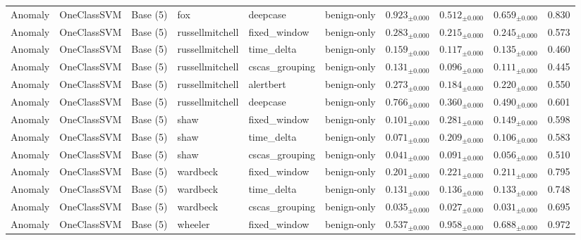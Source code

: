 \begin{longtable}{llllllcccc}
\addlinespace
Anomaly & OneClassSVM & Base (5) & fox & deepcase & benign-only & $0.923_{\pm 0.000}$ & $0.512_{\pm 0.000}$ & $0.659_{\pm 0.000}$ & 0.830 \\
\addlinespace
Anomaly & OneClassSVM & Base (5) & russellmitchell & fixed\_window & benign-only & $0.283_{\pm 0.000}$ & $0.215_{\pm 0.000}$ & $0.245_{\pm 0.000}$ & 0.573 \\
\addlinespace
Anomaly & OneClassSVM & Base (5) & russellmitchell & time\_delta & benign-only & $0.159_{\pm 0.000}$ & $0.117_{\pm 0.000}$ & $0.135_{\pm 0.000}$ & 0.460 \\
\addlinespace
Anomaly & OneClassSVM & Base (5) & russellmitchell & cscas\_grouping & benign-only & $0.131_{\pm 0.000}$ & $0.096_{\pm 0.000}$ & $0.111_{\pm 0.000}$ & 0.445 \\
\addlinespace
Anomaly & OneClassSVM & Base (5) & russellmitchell & alertbert & benign-only & $0.273_{\pm 0.000}$ & $0.184_{\pm 0.000}$ & $0.220_{\pm 0.000}$ & 0.550 \\
\addlinespace
Anomaly & OneClassSVM & Base (5) & russellmitchell & deepcase & benign-only & $0.766_{\pm 0.000}$ & $0.360_{\pm 0.000}$ & $0.490_{\pm 0.000}$ & 0.601 \\
\addlinespace
Anomaly & OneClassSVM & Base (5) & shaw & fixed\_window & benign-only & $0.101_{\pm 0.000}$ & $0.281_{\pm 0.000}$ & $0.149_{\pm 0.000}$ & 0.598 \\
\addlinespace
Anomaly & OneClassSVM & Base (5) & shaw & time\_delta & benign-only & $0.071_{\pm 0.000}$ & $0.209_{\pm 0.000}$ & $0.106_{\pm 0.000}$ & 0.583 \\
\addlinespace
Anomaly & OneClassSVM & Base (5) & shaw & cscas\_grouping & benign-only & $0.041_{\pm 0.000}$ & $0.091_{\pm 0.000}$ & $0.056_{\pm 0.000}$ & 0.510 \\
\addlinespace
Anomaly & OneClassSVM & Base (5) & wardbeck & fixed\_window & benign-only & $0.201_{\pm 0.000}$ & $0.221_{\pm 0.000}$ & $0.211_{\pm 0.000}$ & 0.795 \\
\addlinespace
Anomaly & OneClassSVM & Base (5) & wardbeck & time\_delta & benign-only & $0.131_{\pm 0.000}$ & $0.136_{\pm 0.000}$ & $0.133_{\pm 0.000}$ & 0.748 \\
\addlinespace
Anomaly & OneClassSVM & Base (5) & wardbeck & cscas\_grouping & benign-only & $0.035_{\pm 0.000}$ & $0.027_{\pm 0.000}$ & $0.031_{\pm 0.000}$ & 0.695 \\
\addlinespace
Anomaly & OneClassSVM & Base (5) & wheeler & fixed\_window & benign-only & $0.537_{\pm 0.000}$ & $0.958_{\pm 0.000}$ & $0.688_{\pm 0.000}$ & 0.972 \\

\end{longtable}
